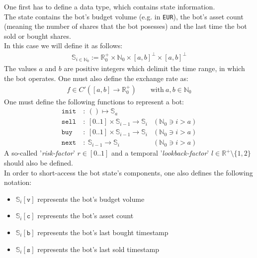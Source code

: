 \documentclass[paper=a4, fontsize=11pt]{scrartcl}
\numberwithin{equation}{section}
\numberwithin{figure}{section}
\numberwithin{table}{section}
\newcommand{\state}[2]{\mathbb{S}_{#1}\left[\texttt{#2}\right]}
\begin{document}
    One first has to define a data type, which contains state information.\\
    The state contains the bot's budget volume (e.g. in \texttt{EUR}), the bot's asset count (meaning the number of shares that the bot posesses) and the last time the bot sold or bought shares.\\
    In this case we will define it as follows:
    \begin{align}
        \mathbb{S}_{i \in \mathbb{N}_0} := \mathbb{R}_0^+ \times \mathbb{N}_0 \times \left[a,b\right]^\perp \times \left[a,b\right]^\perp
    \end{align}
    The values $a$ and $b$ are positive integers which delimit the time range, in which the bot operates. One must also define the exchange rate as:
    \begin{align}
	    f \in \mathit{C'} \left( \left[a,b\right] \rightarrow \mathbb{R}_0^+ \right) \qquad
	    \text{with} \ a, b \in \mathbb{N}_0
    \end{align}
    One must define the following functions to represent a bot:
    \begin{align}
	    \texttt{init} & \ : \ () \longmapsto \mathbb{S}_a \\
	    \texttt{sell} & \ : \ \left[0..1\right] \times \mathbb{S}_{i-1} \rightarrow \mathbb{S}_i & (\mathbb{N}_0 \ni i > a) \\
	    \texttt{buy} & \ : \ \left[0..1\right] \times \mathbb{S}_{i-1} \rightarrow \mathbb{S}_i & (\mathbb{N}_0 \ni i > a) \\
	    \texttt{next} & \ : \ \mathbb{S}_{i-1} \rightarrow \mathbb{S}_i & (\mathbb{N}_0 \ni i > a) 
    \end{align}
    A so-called '\textit{risk-factor}' $r \in \left[0..1\right] $ and a temporal '\textit{lookback-factor}' $l \in \mathbb{R}^+ \setminus \{1,2\} $ should also be defined.
    \\
    In order to short-access the bot state's components, one also defines the following notation:
    \begin{itemize}
	    \item $ \state{i}{v} $ represents the bot's budget volume
	    \item $ \state{i}{c} $ represents the bot's asset count
	    \item $ \state{i}{b} $ represents the bot's last bought timestamp
	    \item $ \state{i}{s} $ represents the bot's last sold timestamp
    \end{itemize}
\end{document}
